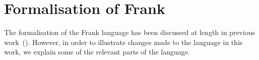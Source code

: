 \documentclass[msc,deptreport,cs]{infthesis} %
\newcommand{\code}[1]{\lstinline{#1}}
\begin{document}


\chapter{Formalisation of Frank}
\label{chap:formalisation}

The formalisation of the Frank language has been discussed at length in previous
work~(\cite{convent2020doo}). However, in order to illustrate changes made to
the language in this work, we explain some of the relevant parts of the
language.
\end{document}

